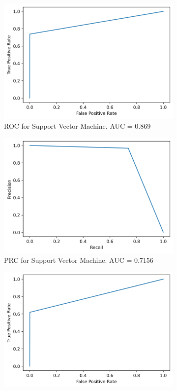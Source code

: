 \documentclass[utf8x]{ctexart}
\begin{document}
\begin{figure}[htb]
\begin{subfigure}[b]{0.48\textwidth}
    \includegraphics[width=\textwidth]{./images/svm_roc.png}
    \caption{ROC for Support Vector Machine. AUC = 0.869}
    \label{fig:svm_roc}
  \end{subfigure}
  \begin{subfigure}[b]{0.48\textwidth}
    \centering
    \includegraphics[width=\textwidth]{./images/svm_prc.png}
    \caption{PRC for Support Vector Machine. AUC = 0.7156}
    \label{fig:svm_prc}
  \end{subfigure}
  \begin{subfigure}[b]{0.48\textwidth}
    \centering
    \includegraphics[width=\textwidth]{./images/rfc_roc.png}

\end{subfigure}
\end{figure}
\end{document}
